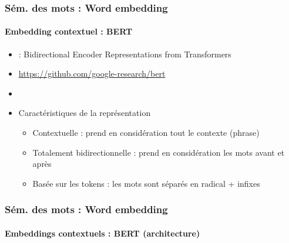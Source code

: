 \documentclass[xcolor=table]{beamer}
\begin{document}
\begin{frame}
\frametitle{Sém. des mots : Word embedding}
\framesubtitle{Embedding contextuel : BERT}

\begin{minipage}{.70\textwidth}
	\begin{itemize}
		\item {} : Bidirectional Encoder Representations from Transformers
		\item \url{https://github.com/google-research/bert}
		\item \cite{2019-devlin-al}
		\item Caractéristiques de la représentation
		\begin{itemize}
			\item Contextuelle :  prend en considération tout le contexte (phrase)
			\item Totalement bidirectionnelle : prend en considération les mots avant et après 
			\item Basée sur les tokens : les mots sont séparés en radical + infixes
		\end{itemize}
	\end{itemize}
\end{minipage}
\begin{minipage}{.28\textwidth}
	\vspace{.5cm}
\end{minipage}
	
\end{frame}

\begin{frame}
\frametitle{Sém. des mots : Word embedding}
\framesubtitle{Embeddings contextuels : BERT (architecture)}
	
	
\end{frame}
\end{document}
